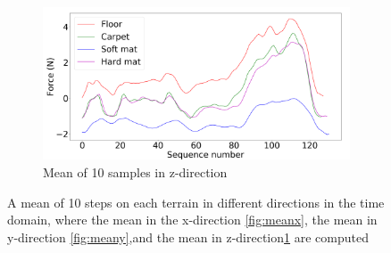 \documentclass[USenglish]{ifimaster}  %
\begin{document}
\begin{figure}[h] \ContinuedFloat
	\begin{subfigure}[b]{0.95\textwidth}
		\includegraphics[width=\textwidth,height=\textheight,keepaspectratio]{Figures/z}
		\caption{Mean of 10 samples in z-direction}
		\label{fig:meanz}
	\end{subfigure}
	
	\caption[Example of the mean of each terrain for each direction in the time domain]{
		A mean of 10 steps on each terrain in different directions in the
		time domain, where the mean in the x-direction \ref{fig:meanx}, the mean in y-direction \ref{fig:meany},and the mean in z-direction\ref{fig:meanz} are computed}
	\label{fig:meanxyz}
\end{figure}
\end{document}
